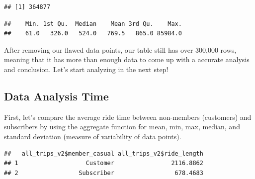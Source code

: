 \documentclass[
]{article}
\newenvironment{Shaded}{\begin{snugshade}}{\end{snugshade}}
\newcommand{\AttributeTok}[1]{\textcolor[rgb]{0.13,0.29,0.53}{#1}}
\newcommand{\CommentTok}[1]{\textcolor[rgb]{0.56,0.35,0.01}{\textit{#1}}}
\newcommand{\FunctionTok}[1]{\textcolor[rgb]{0.13,0.29,0.53}{\textbf{#1}}}
\newcommand{\NormalTok}[1]{#1}
\newcommand{\SpecialCharTok}[1]{\textcolor[rgb]{0.81,0.36,0.00}{\textbf{#1}}}
\begin{document}
\begin{verbatim}
## [1] 364877
\end{verbatim}

\begin{Shaded}
\end{Shaded}

\begin{verbatim}
##    Min. 1st Qu.  Median    Mean 3rd Qu.    Max. 
##    61.0   326.0   524.0   769.5   865.0 85984.0
\end{verbatim}

After removing our flawed data points, our table still has over 300,000
rows, meaning that it has more than enough data to come up with a
accurate analysis and conclusion. Let's start analyzing in the next
step!

\subsection{Data Analysis Time}\label{data-analysis-time}

First, let's compare the average ride time between non-members
(customers) and subscribers by using the aggregate function for mean,
min, max, median, and standard deviation (measure of variability of data
points).

\begin{Shaded}
\end{Shaded}

\begin{verbatim}
##   all_trips_v2$member_casual all_trips_v2$ride_length
## 1                   Customer                2116.8862
## 2                 Subscriber                 678.4683
\end{verbatim}

\begin{Shaded}
\end{Shaded}
\end{document}
